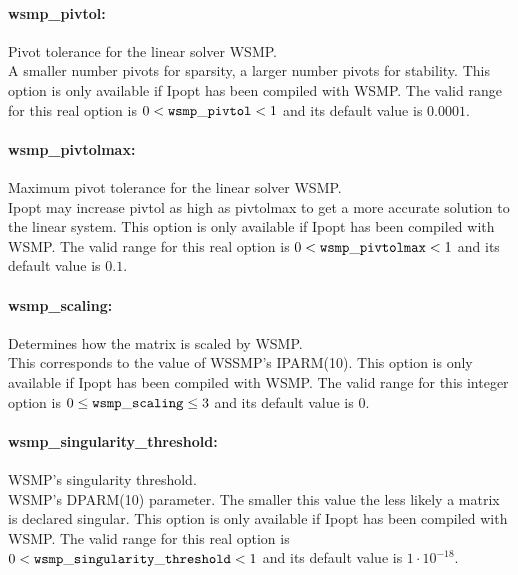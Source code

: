 \paragraph{wsmp\_pivtol:}\label{opt:wsmp_pivtol} Pivot tolerance for the linear solver WSMP.  \\
 A smaller number pivots for sparsity, a larger
number pivots for stability.  This option is only
available if Ipopt has been compiled with WSMP. The valid range for this real option is 
$0 <  {\tt wsmp\_pivtol } <  1$
and its default value is $0.0001$.


\paragraph{wsmp\_pivtolmax:}\label{opt:wsmp_pivtolmax} Maximum pivot tolerance for the linear solver WSMP.  \\
 Ipopt may increase pivtol as high as pivtolmax to
get a more accurate solution to the linear
system.  This option is only available if Ipopt
has been compiled with WSMP. The valid range for this real option is 
$0 <  {\tt wsmp\_pivtolmax } <  1$
and its default value is $0.1$.


\paragraph{wsmp\_scaling:}\label{opt:wsmp_scaling} Determines how the matrix is scaled by WSMP.  \\
 This corresponds to the value of WSSMP's
IPARM(10). This option is only available if Ipopt
has been compiled with WSMP. The valid range for this integer option is
$0 \le {\tt wsmp\_scaling } \le 3$
and its default value is $0$.


\paragraph{wsmp\_singularity\_threshold:}\label{opt:wsmp_singularity_threshold} WSMP's singularity threshold.  \\
 WSMP's DPARM(10) parameter.  The smaller this
value the less likely a matrix is declared
singular.  This option is only available if Ipopt
has been compiled with WSMP. The valid range for this real option is 
$0 <  {\tt wsmp\_singularity\_threshold } <  1$
and its default value is $1 \cdot 10^{-18}$.
